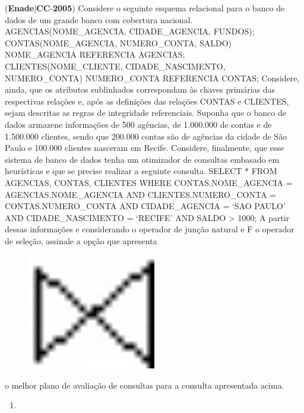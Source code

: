\documentclass{exam}
\begin{document}
\begin{questions}
\begin{enumerate}[label=\alph*)]
	\end{enumerate}

\question (\textbf{Enade}$|$\textbf{CC}-\textbf{2005}) Considere o seguinte esquema relacional para o banco de dados de um grande banco com cobertura nacional.
AGENCIAS(NOME\_AGENCIA, CIDADE\_AGENCIA, FUNDOS);
CONTAS(NOME\_AGENCIA, NUMERO\_CONTA, SALDO) NOME\_AGENCIA REFERENCIA AGENCIAS;
CLIENTES(NOME\_CLIENTE, CIDADE\_NASCIMENTO, NUMERO\_CONTA) NUMERO\_CONTA REFERENCIA CONTAS;
Considere, ainda, que os atributos sublinhados correspondam às chaves primárias das respectivas relações e, após as definições das
relações CONTAS e CLIENTES, sejam descritas as regras de integridade referenciais. Suponha que o banco de dados armazene
informações de 500 agências, de 1.000.000 de contas e de 1.500.000 clientes, sendo que 200.000 contas são de agências da cidade
de São Paulo e 100.000 clientes nasceram em Recife. Considere, finalmente, que esse sistema de banco de dados tenha um otimizador
de consultas embasado em heurísticas e que se precise realizar a seguinte consulta.
SELECT *
FROM AGENCIAS, CONTAS, CLIENTES
WHERE CONTAS.NOME\_AGENCIA = AGENCIAS.NOME\_AGENCIA
AND CLIENTES.NUMERO\_CONTA = CONTAS.NUMERO\_CONTA
AND CIDADE\_AGENCIA = ‘SAO PAULO’
AND CIDADE\_NASCIMENTO = ‘RECIFE’
AND SALDO > 1000;
A partir dessas informações e considerando  o operador de junção natural e F o operador de seleção, assinale a opção que apresenta
\begin{figure}[H]
	\begin{center}
		\includegraphics[width=0.5\textwidth]{CIENCIA_DA_COMPUTACAO_Prova2005-utf8_figuras/fig-0021.jpg}
	\end{center}
\end{figure}
o melhor plano de avaliação de consultas para a consulta apresentada acima.
	\begin{enumerate}[label=\alph*)]
		\item  
\begin{figure}[H]

\end{figure}
\end{enumerate}
\end{questions}
\end{document}
